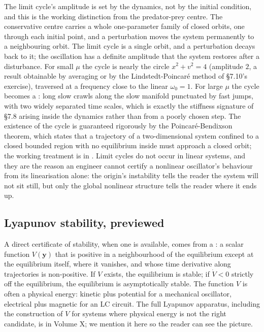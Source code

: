 The limit cycle's amplitude is set by the dynamics, not by the
initial condition, and this is the working distinction from the
predator-prey centre. The conservative centre carries a whole
one-parameter family of closed orbits, one through each initial
point, and a perturbation moves the system permanently to a
neighbouring orbit. The limit cycle is a single orbit, and a
perturbation decays back to it; the oscillation has a definite
amplitude that the system restores after a disturbance. For small
$\mu$ the cycle is nearly the circle $x^{2} + v^{2} = 4$ (amplitude
$2$, a result obtainable by averaging or by the Lindstedt-Poincar\'e
method of \S7.10's exercise), traversed at a frequency close to the
linear $\omega_{0} = 1$. For large $\mu$ the cycle becomes a
: long slow crawls along the slow
manifold punctuated by fast jumps, with two widely separated time
scales, which is exactly the stiffness signature of \S7.8 arising
inside the dynamics rather than from a poorly chosen step. The
existence of the cycle is guaranteed rigorously by the
Poincar\'e-Bendixson theorem, which states that a trajectory of a
two-dimensional system confined to a closed bounded region with no
equilibrium inside must approach a closed orbit; the working
treatment is in \textcite{text:v2ch07-strogatz-nonlinear}. Limit
cycles do not occur in linear systems, and they are the reason an
engineer cannot certify a nonlinear oscillator's behaviour from its
linearisation alone: the origin's instability tells the reader the
system will not sit still, but only the global nonlinear structure
tells the reader where it ends up.

\subsection{Lyapunov stability, previewed}

A direct certificate of stability, when one is available, comes
from a : a scalar function $V(\mathbf{y})$
that is positive in a neighbourhood of the equilibrium except at
the equilibrium itself, where it vanishes, and whose time
derivative along trajectories is non-positive. If $V$ exists, the
equilibrium is stable; if $\dot{V} < 0$ strictly off the
equilibrium, the equilibrium is asymptotically stable. The
function $V$ is often a physical energy: kinetic plus potential for
a mechanical oscillator, electrical plus magnetic for an LC
circuit. The full Lyapunov apparatus, including the construction
of $V$ for systems where physical energy is not the right
candidate, is in Volume X; we mention it here so the reader can
see the picture.

